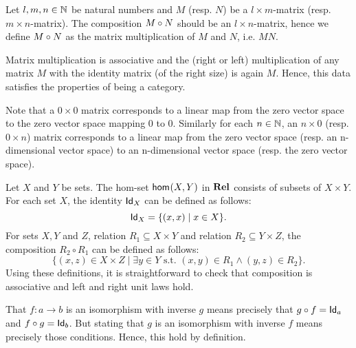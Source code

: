 \begin{solution}
\begin{enumerate}
Let $l,m,n \in\NN$ be natural numbers and $M$ (resp. $N$) be a $l\times m$-matrix (resp. $m\times n$-matrix). The composition $\co{N}{M}$ should be an $l\times n$-matrix, hence we define $\co{N}{M}$ as the matrix multiplication of $M$ and $N$, i.e. $MN$.

Matrix multiplication is associative and the (right or left) multiplication of any matrix $M$ with the identity matrix (of the right size) is again $M$. Hence, this data satisfies the properties of being a category. 

Note that a $0 \times 0$ matrix corresponds to a linear map from the zero vector space to the zero vector space mapping $0$ to $0$.
Similarly for each $n \in \NN$, an $n \times 0$ (resp. $0 \times n$) matrix corresponds to a linear map from the zero vector space (resp. an n-dimensional vector space) to an n-dimensional vector space (resp. the zero vector space).

\end{enumerate}
\end{solution}

\begin{solution} \label{sol:category_of_relations}
Let $X$ and $Y$ be sets. The hom-set $\Hom X Y$ in $\REL$ consists of subsets of $X \times Y$. For each set $X$, the identity $\Id[X]$ can be defined as follows:
\[ \Id[X] = \{ (x,x) \mid x \in X \} .\]
For sets $X,Y$ and $Z$, relation $R_1 \subseteq X \times Y$ and relation $R_2 \subseteq Y \times Z$, the composition $R_2 \circ R_1$ can be defined as follows:
\[ \{ (x,z) \in X \times Z \mid \exists y \in Y \text{ s.t. } (x,y) \in R_1 \wedge (y,z) \in R_2 \} . \]
Using these definitions, it is straightforward to check that composition is associative and left and right unit laws hold.
\end{solution}

\begin{solution}\label{sol:inverse-iso}
That $f:a\to b$ is an isomorphism with inverse $g$ means precisely that $\co{f}{g} = \Id[a]$ and $\co{g}{f} = \Id[b]$. But stating that $g$ is an isomorphism with inverse $f$ means precisely those conditions. Hence, this hold by definition.
\end{solution}


